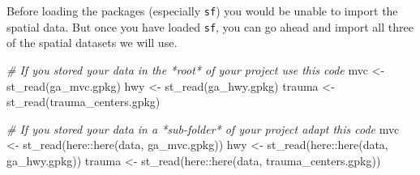 \documentclass[
]{book}
\newenvironment{Shaded}{\begin{snugshade}}{\end{snugshade}}
\newcommand{\CommentTok}[1]{\textcolor[rgb]{0.56,0.35,0.01}{\textit{#1}}}
\newcommand{\FunctionTok}[1]{\textcolor[rgb]{0.00,0.00,0.00}{#1}}
\newcommand{\NormalTok}[1]{#1}
\newcommand{\OtherTok}[1]{\textcolor[rgb]{0.56,0.35,0.01}{#1}}
\newcommand{\SpecialCharTok}[1]{\textcolor[rgb]{0.00,0.00,0.00}{#1}}
\newcommand{\StringTok}[1]{\textcolor[rgb]{0.31,0.60,0.02}{#1}}
\begin{document}
Before loading the packages (especially \texttt{sf}) you would be unable to import the spatial data. But once you have loaded \texttt{sf}, you can go ahead and import all three of the spatial datasets we will use.

\begin{Shaded}
\begin{Highlighting}[]
\CommentTok{\# If you stored your data in the *root* of your project use this code}
\NormalTok{mvc }\OtherTok{\textless{}{-}} \FunctionTok{st\_read}\NormalTok{(}\StringTok{\textquotesingle{}ga\_mvc.gpkg\textquotesingle{}}\NormalTok{)}
\NormalTok{hwy }\OtherTok{\textless{}{-}} \FunctionTok{st\_read}\NormalTok{(}\StringTok{\textquotesingle{}ga\_hwy.gpkg\textquotesingle{}}\NormalTok{)}
\NormalTok{trauma }\OtherTok{\textless{}{-}} \FunctionTok{st\_read}\NormalTok{(}\StringTok{\textquotesingle{}trauma\_centers.gpkg\textquotesingle{}}\NormalTok{)}

\CommentTok{\# If you stored your data in a *sub{-}folder* of your project adapt this code}
\NormalTok{mvc }\OtherTok{\textless{}{-}} \FunctionTok{st\_read}\NormalTok{(here}\SpecialCharTok{::}\FunctionTok{here}\NormalTok{(}\StringTok{\textquotesingle{}data\textquotesingle{}}\NormalTok{, }\StringTok{\textquotesingle{}ga\_mvc.gpkg\textquotesingle{}}\NormalTok{))}
\NormalTok{hwy }\OtherTok{\textless{}{-}} \FunctionTok{st\_read}\NormalTok{(here}\SpecialCharTok{::}\FunctionTok{here}\NormalTok{(}\StringTok{\textquotesingle{}data\textquotesingle{}}\NormalTok{, }\StringTok{\textquotesingle{}ga\_hwy.gpkg\textquotesingle{}}\NormalTok{))}
\NormalTok{trauma }\OtherTok{\textless{}{-}} \FunctionTok{st\_read}\NormalTok{(here}\SpecialCharTok{::}\FunctionTok{here}\NormalTok{(}\StringTok{\textquotesingle{}data\textquotesingle{}}\NormalTok{, }\StringTok{\textquotesingle{}trauma\_centers.gpkg\textquotesingle{}}\NormalTok{))}
\end{Highlighting}
\end{Shaded}
\end{document}
